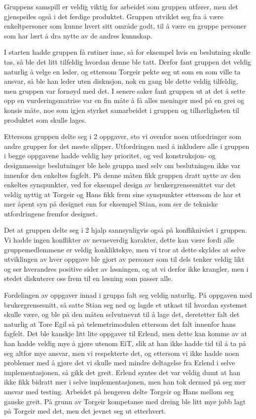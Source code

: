 Gruppens samspill er veldig viktig for arbeidet som gruppen utfører, men det gjenspeiles også i det ferdige produktet.
Gruppen utviklet seg fra å være enkeltpersoner som kunne hvert sitt område godt, til å være en gruppe personer som har lært å dra nytte av de andres kunnskap.

I starten hadde gruppen få rutiner inne, så for eksempel hvis en beslutning skulle tas, så ble det litt tilfeldig hvordan denne ble tatt. Derfor fant gruppen det veldig naturlig å velge en leder, og ettersom Torgeir pekte seg ut som en som ville ta ansvar, så ble han leder uten diskusjon, nok en gang ble dette veldig tilfeldig, men gruppen var fornøyd med det. I senere saker fant gruppen ut at det å sette opp en vurderingsmatrise var en fin måte å få alles meninger med på en grei og konsis måte, noe som igjen styrket samarbeidet i gruppen og tilhørligheten til produktet som skulle lages.

Ettersom gruppen delte seg i 2 oppgaver, sto vi ovenfor noen utfordringer som andre grupper for det meste slipper. Utfordringen med å inkludere alle i gruppen i begge oppgavene hadde veldig høy prioritet, og ved konstruksjon- og designmessige beslutninger ble hele gruppa med selv om beslutningen ikke var innenfor den enkeltes fagfelt. På denne måten fikk gruppen dratt nytte av den enkeltes synspunkter, ved for eksempel design av brukergrensesnittet var det veldig nyttig at Torgeir og Hans fikk frem sine synspunkter ettersom de har et mer åpent syn på designet enn for eksempel Stian, som ser de tekniske utfordringene fremfor designet.

Det at gruppen delte seg i 2 hjalp sannsynligvis også på konfliknivået i gruppen. Vi hadde ingen konflikter av nevneverdig karakter, dette kan være fordi alle gruppemedlemmene er veldig konkliktskye, men vi tror at dette skyldes at selve utviklingen av hver oppgave ble gjort av personer som til dels tenker veldig likt og ser hverandres positive sider av løsningen, og at vi derfor ikke krangler, men i stedet diskuterer oss frem til en løsning som passer alle.

Fordelingen av oppgaver innad i gruppa falt seg veldig naturlig. På oppgaven med brukergrensesnitt, så satte Stian seg ned og lagde et utkast til hvordan systemet skulle være, og ble på den måten selvutnevnt til å lage det, deretetter falt det naturlig at Tore Egil så på telemetrimodulen ettersom det falt innenfor hans fagfelt. Det ble kanskje litt lite oppgaver til Erlend, men dette kan komme av at han hadde veldig mye å gjøre utenom EiT, slik at han ikke hadde tid til å ta på seg altfor mye ansvar, men vi respekterte det, og ettersom vi ikke hadde noen problemer med å gjøre det vi skulle med mindre deltagelse fra Erlend i selve implementasjonen, så gikk det greit. Erlend syntes det var veldig dumt at han ikke fikk bidratt mer i selve implementasjonen, men han tok dermed på seg mer ansvar med testing. Arbeidet på hengeren delte Torgeir og Hans mellom seg ganske greit. På grunn av Torgeir kompetanse med dreing ble litt mye jobb lagt på Torgeir med det, men det jevnet seg ut etterhvert.


